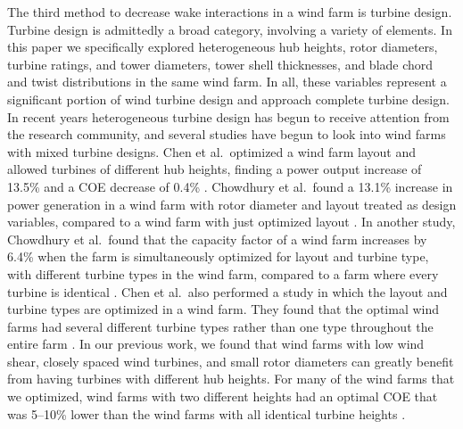 \documentclass[WESD, manuscript]{copernicus}
\begin{document}
The third method to decrease wake interactions in a wind farm is turbine design. Turbine design is admittedly a broad category, involving a variety of elements. In this paper we specifically explored heterogeneous hub heights, rotor diameters, turbine ratings, and tower diameters, tower shell thicknesses, and blade chord and twist distributions in the same wind farm. In all, these variables represent a significant portion of wind turbine design and approach complete turbine design. 
In recent years heterogeneous turbine design has begun to receive attention from the research community, and several studies have begun to look into wind farms with mixed turbine designs. Chen et al.~optimized
a wind farm layout and allowed turbines of different hub heights, finding a power output increase of 13.5\% and a COE decrease of 0.4\% \citep{chen2013wind}. Chowdhury et al.~found
a 13.1\% increase in power generation in a wind farm with rotor diameter and layout treated as design variables, compared to a wind farm with just optimized layout \citep{chowdhury2010optimizing}. In another study, Chowdhury et al.~found that the capacity factor of a wind farm increases by 6.4\% when the farm is simultaneously optimized for layout and turbine type, with different turbine types in the wind farm, compared to a farm where every turbine is identical \citep{chowdhury2013optimizing}. Chen et al.~also performed a study in which the layout and turbine types are optimized in a wind farm. They found that the optimal wind farms had several different turbine types rather than one type throughout the entire farm \citep{chen2015multi}. In our previous work, we found that wind farms with low wind shear, closely spaced wind turbines, and small rotor diameters can greatly benefit from having turbines with different hub heights. For many of the wind farms that we optimized, wind farms with two different heights had an optimal COE that was 5--10\% lower than the wind farms with all identical turbine heights \citep{stanley2018}.
\end{document}
